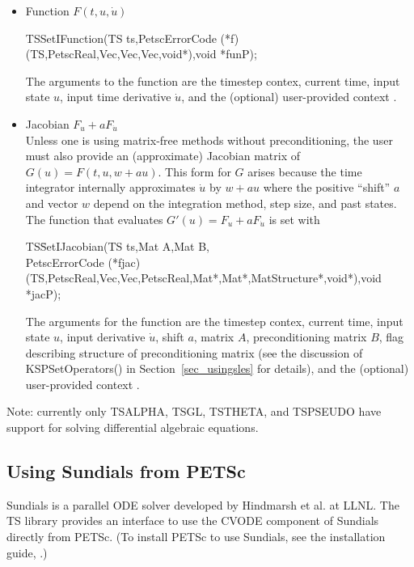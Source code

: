 \begin{itemize}
\item Function $F(t,u,\dot{u})$
  \begin{tabbing}
    TSSetIFunction(TS ts,PetscErrorCode (*f)(TS,PetscReal,Vec,Vec,Vec,void*),void *funP);
  \end{tabbing}
  The arguments to the function  are the
  timestep contex, current time, input state $u$, input time derivative
  $\dot{u}$, and the (optional) user-provided context .

\item Jacobian $F_u + aF_{\dot{u}}$ \\
  Unless one is using matrix-free methods without preconditioning, the user must also provide an (approximate) Jacobian matrix of $G(u) = F(t,u,w+au)$.
  This form for $G$ arises because the time integrator internally approximates $\dot{u}$ by $w+au$ where the positive ``shift'' $a$ and vector $w$ depend on the integration method, step size, and past states.
  The function that evaluates $G'(u) = F_u + aF_{\dot{u}}$ is set with
  \begin{tabbing}
    TS\=SetIJacobian(TS ts,Mat A,Mat B,\\
    \>PetscErrorCode (*fjac)(TS,PetscReal,Vec,Vec,PetscReal,Mat*,Mat*,MatStructure*,void*),void *jacP);
  \end{tabbing}
  The arguments for the function 
  are the timestep contex, current time, input state $u$, input
  derivative $\dot{u}$, shift $a$, matrix $A$, preconditioning matrix
  $B$, flag describing structure of preconditioning matrix (see the
  discussion of KSPSetOperators() in Section~\ref{sec_usingsles} for
  details), and the (optional) user-provided context .
\end{itemize}

Note: currently only TSALPHA, TSGL, TSTHETA, and TSPSEUDO have
support for solving differential algebraic equations.

\subsection{Using Sundials from PETSc}
\label{sec_sundials}

Sundials is a parallel ODE solver developed by Hindmarsh et al. at LLNL.
The TS library provides an interface to use the CVODE component of
Sundials directly from PETSc.  (To install PETSc to use Sundials, see
the installation guide, .)

